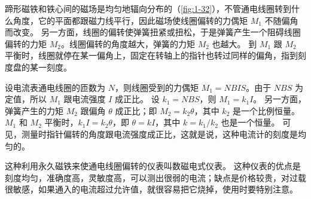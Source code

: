 蹄形磁铁和铁心间的磁场是均匀地辐向分布的（\cref{fig:1-32}），不管通电线圈转到什么角度，它的平面都跟磁力线平行，因此磁场使线圈偏转的力偶矩 $M_1$ 不随偏角而改变。
另一方面，线圈的偏转使弹簧扭紧或扭松，于是弹簧产生一个阻碍线圈偏转的力矩 $M_2$。线圈偏转的角度越大，弹簧的力矩 $M_2$ 也越大。
到 $M_1$ 跟 $M_2$ 平衡时，线圈就停在某一偏角上，固定在转轴上的指针也转过同样的偏角，指到刻度盘的某一刻度。

设电流表通电线圈的匝数为 $N$，则线圈受到的力偶矩 $M_1=NBIS$。由于 $NBS$ 为定值，所以 $M_1$ 跟电流强度 $I$ 成正比。
设 $k_1=NBS$，则 $M_1=k_1I$。
另一方面，弹簧产生的力矩 $M_2$ 跟偏角 $\theta$ 成正比；即 $M_2=k_2\theta$，其中 $k_2$ 是一个比例恒量。
$M_1$ 和 $M_2$ 平衡时，$k_1I=k_2\theta$，即 $\theta =kI$，其中 $k=k_1/k_2$ 也是一个恒量。
可见，测量时指针偏转的角度跟电流强度成正比，这就是说，这种电流计的刻度是均匀的。

这种利用永久磁铁来使通电线圈偏转的仪表叫数磁电式仪表。
这种仪表的优点是刻度均匀，准确度高，灵敏度高，可以测出很弱的电流；缺点是价格较贵，对过载很敏感，如果通入的电流超过允许值，就很容易把它烧掉，使用时要特别注意。

